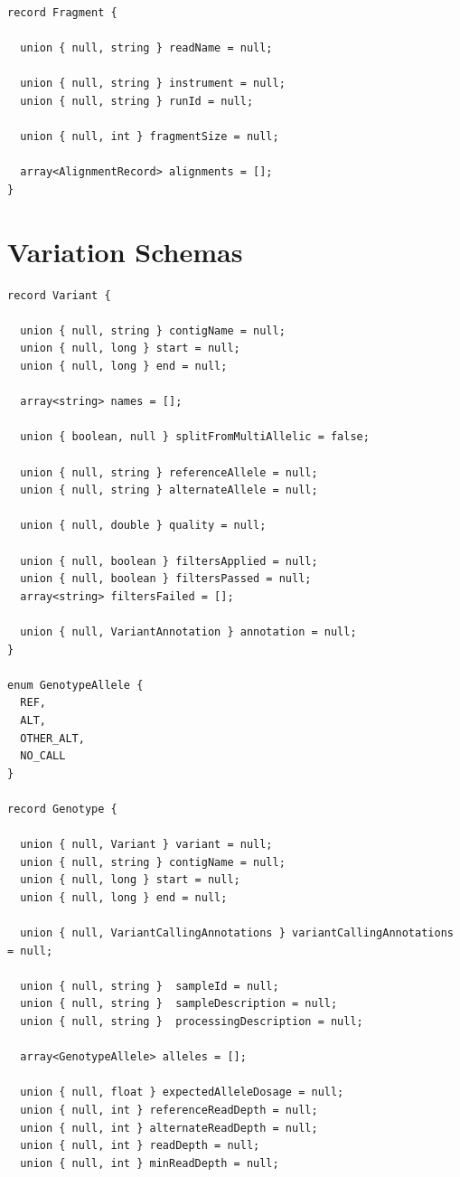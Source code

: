 \documentclass[phd]{ucbthesis}
\begin{document}
\begin{lstlisting}[caption={ADAM} fragment schema]
record Fragment {

  union { null, string } readName = null;

  union { null, string } instrument = null;
  union { null, string } runId = null;

  union { null, int } fragmentSize = null;

  array<AlignmentRecord> alignments = [];
}
\end{lstlisting}

\section{Variation Schemas}
\label{sec:variation-schemas}

\begin{lstlisting}[caption={ADAM} core variant and genotype schemas]
record Variant {

  union { null, string } contigName = null;
  union { null, long } start = null;
  union { null, long } end = null;

  array<string> names = [];

  union { boolean, null } splitFromMultiAllelic = false;

  union { null, string } referenceAllele = null;
  union { null, string } alternateAllele = null;

  union { null, double } quality = null;

  union { null, boolean } filtersApplied = null;
  union { null, boolean } filtersPassed = null;
  array<string> filtersFailed = [];

  union { null, VariantAnnotation } annotation = null;
}

enum GenotypeAllele {
  REF,
  ALT,
  OTHER_ALT,
  NO_CALL
}

record Genotype {

  union { null, Variant } variant = null;
  union { null, string } contigName = null;
  union { null, long } start = null;
  union { null, long } end = null;

  union { null, VariantCallingAnnotations } variantCallingAnnotations = null;

  union { null, string }  sampleId = null;
  union { null, string }  sampleDescription = null;
  union { null, string }  processingDescription = null;

  array<GenotypeAllele> alleles = [];

  union { null, float } expectedAlleleDosage = null;
  union { null, int } referenceReadDepth = null;
  union { null, int } alternateReadDepth = null;
  union { null, int } readDepth = null;
  union { null, int } minReadDepth = null;


\end{lstlisting}
\end{document}
